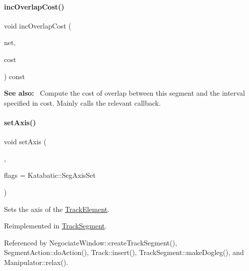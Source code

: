 \mbox{\label{classKite_1_1TrackElement_a7f1126d43df68dd4edbb8d047a134edb}} 
\paragraph{\texorpdfstring{inc\+Overlap\+Cost()}{incOverlapCost()}}
{\footnotesize\ttfamily void inc\+Overlap\+Cost (\begin{DoxyParamCaption}\item[{\textbf{ Net} $\ast$}]{net,  }\item[{Track\+Cost \&}]{cost }\end{DoxyParamCaption}) const\hspace{0.3cm}{\ttfamily [virtual]}}

{\bfseries See also\+:}~ Compute the cost of overlap between this segment and the interval specified in {\ttfamily cost}. Mainly calls the relevant callback. \mbox{\label{classKite_1_1TrackElement_a45e685b1e3ee630d24bf43746553af4c}} 
\paragraph{\texorpdfstring{set\+Axis()}{setAxis()}}
{\footnotesize\ttfamily void set\+Axis (\begin{DoxyParamCaption}\item[{\textbf{ Db\+U\+::\+Unit}}]{,  }\item[{unsigned int}]{flags = {\ttfamily Katabatic\+:\+:SegAxisSet} }\end{DoxyParamCaption})\hspace{0.3cm}{\ttfamily [virtual]}}

Sets the axis of the \hyperlink{classKite_1_1TrackElement}{Track\+Element}. 

Reimplemented in \hyperlink{classKite_1_1TrackSegment_a262a915c38127d3722ec561b30d80f91}{Track\+Segment}.



Referenced by Negociate\+Window\+::create\+Track\+Segment(), Segment\+Action\+::do\+Action(), Track\+::insert(), Track\+Segment\+::make\+Dogleg(), and Manipulator\+::relax().

